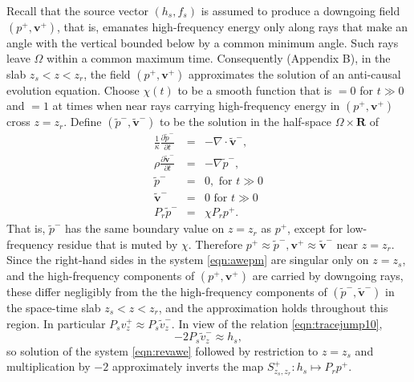 \documentclass[georeport,12pt]{geophysics}
\newcommand{\bv}{\mathbf{v}}
\newcommand{\bR}{\mathbf{R}}
\begin{document}
Recall that the source vector $(h_s,f_s)$ is assumed to produce a
downgoing field $(p^+,\bv^+)$, that is, emanates high-frequency energy only along
rays that make an angle with the vertical bounded below by a common
minimum angle. Such rays leave $\Omega$ within a common maximum
time. Consequently (Appendix B), in the
slab $z_s<z<z_r$, the field $(p^+,\bv^+)$ approximates the solution of an
anti-causal evolution equation. Choose $\chi(t)$ to be a smooth function
that is $= 0$ for $t \gg 0$ and $=1$ at times when near rays carrying
high-frequency energy in $(p^+,\bv^+)$ cross $z=z_r$. Define 
$(\tilde{p}^-,\tilde{\bv}^-)$ to be the solution in the half-space
$\Omega \times \bR$ of
\begin{eqnarray}
\label{eqn:revawe}
  \frac{1}{\kappa}\frac{\partial \tilde{p}^-}{\partial t} & = & - \nabla \cdot \tilde{\bv}^-, \nonumber \\
  \rho\frac{\partial \tilde{\bv}^-}{\partial t} & = & - \nabla \tilde{p}^-,\nonumber \\
  \tilde{p}^- & =& 0,  \mbox{ for } t \gg 0\\ 
  \tilde{\bv}^- & = & 0 \mbox{ for } t \gg 0\\
  P_r\tilde{p}^- &=& \chi P_rp^+ . 
\end{eqnarray}
That is, $\tilde{p}^-$ has the same boundary value on $z=z_r$ as
$p^+$, except for low-frequency residue that is muted by
$\chi$. Therefore
$p^+ \approx \tilde{p}^-, \bv^+ \approx \tilde{\bv}^-$ near
$z=z_r$. Since the right-hand sides in the system \ref{eqn:awepm} are
singular only on $z=z_s$, and the high-frequency components of
$(p^+,\bv^+)$ are carried by downgoing rays, these differ negligibly
from the the high-frequency components of
$(\tilde{p}^-,\tilde{\bv}^-)$ in the space-time slab $z_s<z<z_r$, and
the approximation holds throughout this region. In particular
$P_sv^+_z \approx P_s \tilde{v}^-_z$. In view of the relation
\ref{eqn:tracejump10},
\begin{equation}
  \label{eqn:tildevtohsubs}
  -2P_s\tilde{v}^-_z \approx h_s,
\end{equation}
so solution
of the system \ref{eqn:revawe} followed by restriction to $z=z_s$ and
multiplication by $-2$ 
approximately inverts the map $S^+_{z_s,z_r}: h_s \mapsto P_rp^+$.
\end{document}

